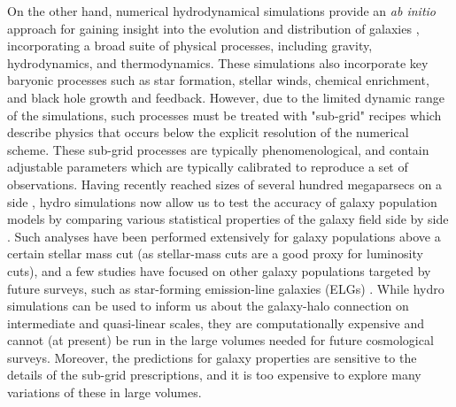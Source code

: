 \documentclass[fleqn,usenatbib]{mnras}
\begin{document}
On the other hand, numerical hydrodynamical simulations provide an \textit{ab initio} approach for gaining insight into the evolution and distribution of galaxies \citep[e.g.][]{2014MNRAS.444.1518V,2015MNRAS.446..521S}, incorporating a broad suite of physical processes, including gravity, hydrodynamics, and thermodynamics. These simulations also incorporate key baryonic processes such as star formation, stellar winds, chemical enrichment, and black hole growth and feedback. However, due to the limited dynamic range of the simulations, such processes must be treated with "sub-grid" recipes which describe physics that occurs below the explicit resolution of the numerical scheme. These sub-grid processes are typically phenomenological, and contain adjustable parameters which are typically calibrated to reproduce a set of observations. Having recently reached sizes of several hundred megaparsecs on a side \citep{2016MNRAS.460.3100C,2018MNRAS.475..676S}, hydro simulations now allow us to test the accuracy of galaxy population models by comparing various statistical properties of the galaxy field side by side \citep{sownak,2020MNRAS.493.5506H,2021MNRAS.504.5205C}. Such analyses have been performed extensively for galaxy populations above a certain stellar mass cut (as stellar-mass cuts are a good proxy for luminosity cuts), and a few  studies have focused on other galaxy populations targeted by future surveys, such as star-forming emission-line galaxies (ELGs) \citep[e.g.][]{Zheng:2004id,2018MNRAS.480..864C,2017MNRAS.472..550F,2016MNRAS.459.3040G,2018MNRAS.474.4024G,2019MNRAS.483.4501A,2021MNRAS.502.3599H}. 
While hydro simulations can be used to inform us about the galaxy-halo connection on intermediate and quasi-linear scales, they are computationally expensive and cannot (at present) be run in the large volumes needed for future cosmological surveys. Moreover, the predictions for galaxy properties are sensitive to the details of the sub-grid prescriptions, and it is too expensive to explore many variations of these in large volumes. 
\end{document}

